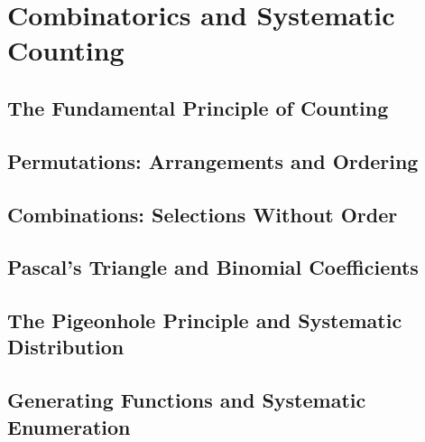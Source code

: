 

\chapter{Combinatorics and Systematic Counting}

\section{The Fundamental Principle of Counting}

\section{Permutations: Arrangements and Ordering}

\section{Combinations: Selections Without Order}

\section{Pascal's Triangle and Binomial Coefficients}

\section{The Pigeonhole Principle and Systematic Distribution}

\section{Generating Functions and Systematic Enumeration}
